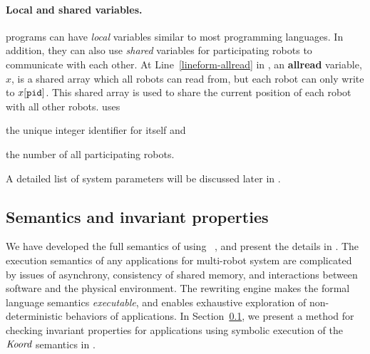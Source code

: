 \paragraph{Local and shared variables.}
 \lgname programs can have  \emph{local} variables similar to most programming languages.
%
%
In addition, they can also use \emph{shared} variables for participating robots to communicate with each other.
At Line~\ref{lineform-allread} in ,
an \textbf{allread} variable, $x$, is a shared array which all robots can read from,
but each robot \myuin can only write to $x[\texttt{pid}]$.
This shared array is used to share the current position of each robot with all other robots.
\LineForm uses
\begin{inparaenum}[(a)]
    \item the unique integer identifier \myuin for itself and
    \item the number \NMAX of all participating robots.
\end{inparaenum}
A detailed list of system parameters will be discussed later in .



\subsection{Semantics and invariant properties}

We have developed the full semantics of \lgname using \K~\cite{rosu-serbanuta-2013-k}, and present the details in . The execution semantics of any applications for multi-robot system are complicated by issues of asynchrony, consistency of shared memory, and interactions between software and  the physical environment.
The \K rewriting engine makes the formal language semantics \emph{executable}, and enables exhaustive exploration of non-deterministic behaviors of \lgname applications.
In Section~\ref{}, we present a method for checking invariant properties for \lgname applications using symbolic execution of the $\emph{Koord}$ semantics in \K.


